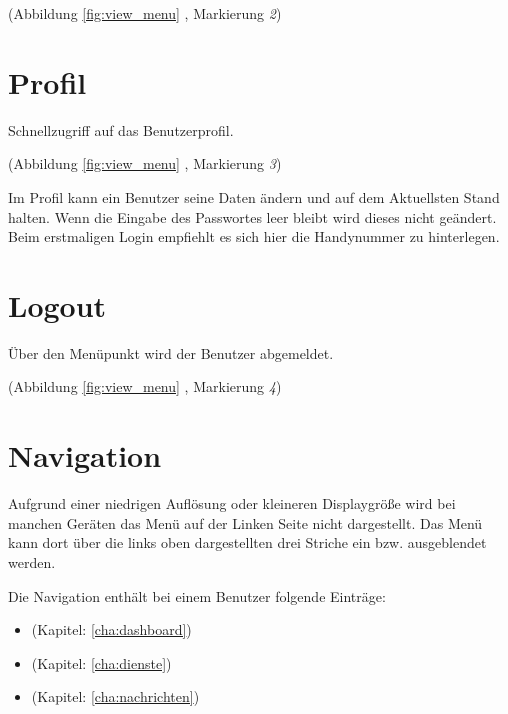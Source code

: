 \noindent (Abbildung \ref{fig:view_menu} \textit{}, Markierung \textit{2})

\section{Profil}
\label{sec:menu_profile}
Schnellzugriff auf das Benutzerprofil.

\noindent (Abbildung \ref{fig:view_menu} \textit{}, Markierung \textit{3})

\vspace*{5mm} \noindent Im Profil kann ein Benutzer seine Daten ändern und auf dem Aktuellsten Stand halten. Wenn die Eingabe des Passwortes leer bleibt wird dieses nicht geändert. Beim erstmaligen Login empfiehlt es sich hier die Handynummer zu hinterlegen.  

\section{Logout}
\label{sec:menu_logout}
Über den Menüpunkt wird der Benutzer abgemeldet.

\noindent (Abbildung \ref{fig:view_menu} \textit{}, Markierung \textit{4})

\section{Navigation}
\label{sec:menu_navigation}
Aufgrund einer niedrigen Auflösung oder kleineren Displaygröße wird bei manchen Geräten das Menü auf der Linken Seite nicht dargestellt. Das Menü kann dort über die links oben dargestellten drei Striche ein bzw. ausgeblendet werden.

\noindent Die Navigation enthält bei einem Benutzer folgende Einträge: 
\begin{itemize}
\item {} (Kapitel: \ref{cha:dashboard})
\item {} (Kapitel: \ref{cha:dienste})
\item {} (Kapitel: \ref{cha:nachrichten})
\end{itemize}